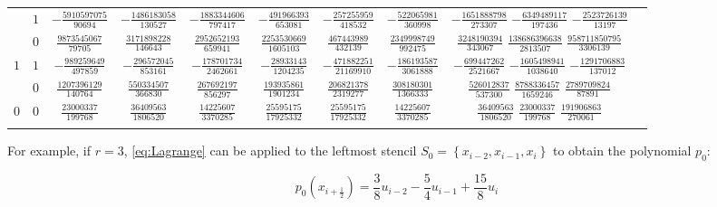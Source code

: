 \begin{table}
\begin{center}
\begin{tabular}{cccccccccc}
           &  $1$  &  $-\frac{  5910597075}{  90694}$  &  $-\frac{  1486183058}{ 130527}$  &  $-\frac{ 1883344606}{  797417}$  &  $-\frac{ 491966393}{  653081}$  &  $-\frac{ 257255959}{  418532}$  &  $-\frac{ 522065981}{  360998}$  &  $-\frac{ 1651888798}{  273307}$  $-\frac{  6349489117}{ 197436}$  $-\frac{  2523726139}{  13197}$  \\ \addlinespace
           &  $0$  &  $ \frac{  9873545067}{  79705}$  &  $ \frac{  3171898228}{ 146643}$  &  $ \frac{ 2952652193}{  659941}$  &  $ \frac{2253530669}{ 1605103}$  &  $ \frac{ 467443989}{  432139}$  &  $ \frac{2349998749}{  992475}$  &  $ \frac{ 3248190394}{  343067}$  $ \frac{138686396638}{2813507}$  $ \frac{958711850795}{3306139}$  \\ \addlinespace
      $1$  &  $1$  &  $-\frac{   989259649}{ 497859}$  &  $-\frac{   296572045}{ 853161}$  &  $-\frac{  178701734}{ 2462661}$  &  $-\frac{  28933143}{ 1204235}$  &  $-\frac{ 471882251}{21169910}$  &  $-\frac{ 186193587}{ 3061888}$  &  $-\frac{  699447262}{ 2521667}$  $-\frac{  1605498941}{1038640}$  $-\frac{  1291706883}{ 137012}$  \\ \addlinespace
           &  $0$  &  $ \frac{  1207396129}{ 140764}$  &  $ \frac{   550334507}{ 366830}$  &  $ \frac{  267692197}{  856297}$  &  $ \frac{ 193935861}{ 1901234}$  &  $ \frac{ 206821378}{ 2319277}$  &  $ \frac{ 308180301}{ 1366333}$  &  $ \frac{  526012837}{  537300}$  $ \frac{  8788336457}{1659246}$  $ \frac{  2789709824}{  87891}$  \\ \addlinespace
      $0$  &  $0$  &  $ \frac{    23000337}{ 199768}$  &  $ \frac{    36409563}{1806520}$  &  $ \frac{   14225607}{ 3370285}$  &  $ \frac{  25595175}{17925332}$  &  $ \frac{  25595175}{17925332}$  &  $ \frac{  14225607}{ 3370285}$  &  $ \frac{   36409563}{ 1806520}$  $ \frac{    23000337}{ 199768}$  $ \frac{   191906863}{ 270061}$  \\ \addlinespace
      \bottomrule
    \end{tabular}
  \end{center}
\end{table}

For example, if $r=3$, \eqref{eq:Lagrange} can be applied to the leftmost stencil $S_0=\left\{ x_{i-2}, x_{i-1}, x_i \right\}$ to obtain the polynomial $p_0$:

\begin{equation}
  \label{eq:pol_0}
  p_0(x_{i+\frac{1}{2}}) = \frac{3}{8} u_{i-2} - \frac{5}{4} u_{i-1} + \frac{15}{8} u_i
\end{equation}

